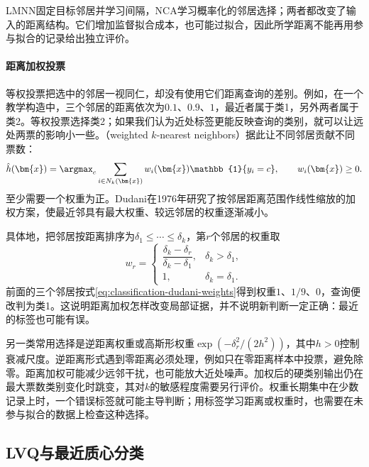 LMNN固定目标邻居并学习间隔，NCA学习概率化的邻居选择；两者都改变了输入的距离结构。它们增加监督拟合成本，也可能过拟合，因此所学距离不能再用参与拟合的记录给出独立评价。

\paragraph{距离加权投票}
等权投票把选中的邻居一视同仁，却没有使用它们距离查询的差别。例如，在一个教学构造中，三个邻居的距离依次为$0.1$、$0.9$、$1$，最近者属于类1，另外两者属于类2。等权投票选择类2；如果我们认为近处标签更能反映查询的类别，就可以让远处两票的影响小一些。（weighted $k$-nearest neighbors）据此让不同邻居贡献不同票数：
\begin{equation}
  \hat h(\bm{x})=\argmax_c
  \sum_{i\in N_k(\bm{x})}
  w_i(\bm{x})\mathbb{1}\{y_i=c\},
  \qquad w_i(\bm{x})\geq0.
  \label{eq:classification-weighted-knn}
\end{equation}
至少需要一个权重为正。Dudani在1976年研究了按邻居距离范围作线性缩放的加权方案，使最近邻具有最大权重、较远邻居的权重逐渐减小。

具体地，把邻居按距离排序为$\delta_1\leq\cdots\leq\delta_k$，第$r$个邻居的权重取
\begin{equation}
  w_r=
  \begin{cases}
    \dfrac{\delta_k-\delta_r}{\delta_k-\delta_1},
      & \delta_k>\delta_1,\\[4pt]
    1, & \delta_k=\delta_1.
  \end{cases}
  \label{eq:classification-dudani-weights}
\end{equation}
前面的三个邻居按式\eqref{eq:classification-dudani-weights}得到权重$1$、$1/9$、$0$，查询便改判为类1。这说明距离加权怎样改变局部证据，并不说明新判断一定正确：最近的标签也可能有误。

另一类常用选择是逆距离权重或高斯形权重$\exp(-\delta_r^2/(2h^2))$，其中$h>0$控制衰减尺度。逆距离形式遇到零距离必须处理，例如只在零距离样本中投票，避免除零。距离加权可能减少远邻干扰，也可能放大近处噪声。加权后的硬类别输出仍在最大票数类别变化时跳变，其对$k$的敏感程度需要另行评价。权重长期集中在少数记录上时，一个错误标签就可能主导判断；用标签学习距离或权重时，也需要在未参与拟合的数据上检查这种选择。

\subsection{LVQ与最近质心分类}
\label{sec:classification-instances-comparison}

